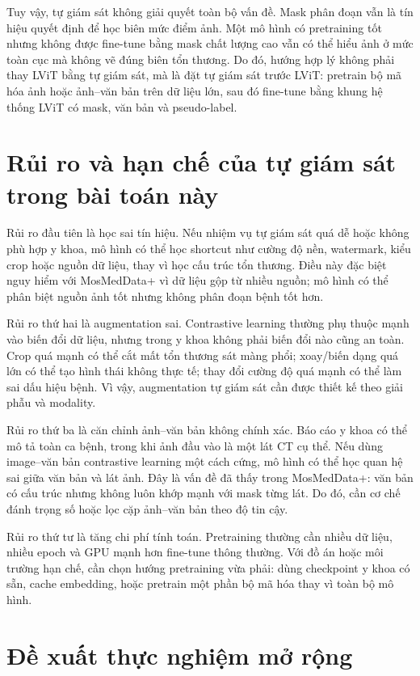 Tuy vậy, tự giám sát không giải quyết toàn bộ vấn đề. Mask phân đoạn vẫn là tín hiệu quyết định để học biên mức điểm ảnh. Một mô hình có pretraining tốt nhưng không được fine-tune bằng mask chất lượng cao vẫn có thể hiểu ảnh ở mức toàn cục mà không vẽ đúng biên tổn thương. Do đó, hướng hợp lý không phải thay LViT bằng tự giám sát, mà là đặt tự giám sát trước LViT: pretrain bộ mã hóa ảnh hoặc ảnh--văn bản trên dữ liệu lớn, sau đó fine-tune bằng khung hệ thống LViT có mask, văn bản và pseudo-label.

\section{Rủi ro và hạn chế của tự giám sát trong bài toán này}

Rủi ro đầu tiên là học sai tín hiệu. Nếu nhiệm vụ tự giám sát quá dễ hoặc không phù hợp y khoa, mô hình có thể học shortcut như cường độ nền, watermark, kiểu crop hoặc nguồn dữ liệu, thay vì học cấu trúc tổn thương. Điều này đặc biệt nguy hiểm với MosMedData+ vì dữ liệu gộp từ nhiều nguồn; mô hình có thể phân biệt nguồn ảnh tốt nhưng không phân đoạn bệnh tốt hơn.

Rủi ro thứ hai là augmentation sai. Contrastive learning thường phụ thuộc mạnh vào biến đổi dữ liệu, nhưng trong y khoa không phải biến đổi nào cũng an toàn. Crop quá mạnh có thể cắt mất tổn thương sát màng phổi; xoay/biến dạng quá lớn có thể tạo hình thái không thực tế; thay đổi cường độ quá mạnh có thể làm sai dấu hiệu bệnh. Vì vậy, augmentation tự giám sát cần được thiết kế theo giải phẫu và modality.

Rủi ro thứ ba là căn chỉnh ảnh--văn bản không chính xác. Báo cáo y khoa có thể mô tả toàn ca bệnh, trong khi ảnh đầu vào là một lát CT cụ thể. Nếu dùng image--văn bản contrastive learning một cách cứng, mô hình có thể học quan hệ sai giữa văn bản và lát ảnh. Đây là vấn đề đã thấy trong MosMedData+: văn bản có cấu trúc nhưng không luôn khớp mạnh với mask từng lát. Do đó, cần cơ chế đánh trọng số hoặc lọc cặp ảnh--văn bản theo độ tin cậy.

Rủi ro thứ tư là tăng chi phí tính toán. Pretraining thường cần nhiều dữ liệu, nhiều epoch và GPU mạnh hơn fine-tune thông thường. Với đồ án hoặc môi trường hạn chế, cần chọn hướng pretraining vừa phải: dùng checkpoint y khoa có sẵn, cache embedding, hoặc pretrain một phần bộ mã hóa thay vì toàn bộ mô hình.

\section{Đề xuất thực nghiệm mở rộng}

